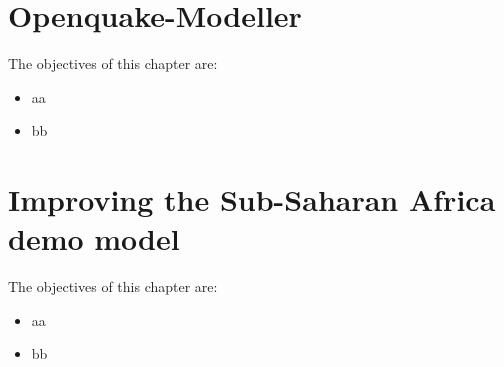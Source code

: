 \documentclass[11pt,a4paper,headings=small,dvips]{scrbook}
\newenvironment{myfancybox}{%
  \def\FrameCommand{\fboxsep=\FrameSep \fcolorbox{blue01}{honeydew}}%
  \color{black}\MakeFramed {\FrameRestore}}%
 {\endMakeFramed}
\begin{document}
\chapter{Openquake-Modeller}
\begin{myfancybox}
The objectives of this chapter are:
\begin{itemize}
    \item aa
    \item bb
\end{itemize}
\end{myfancybox}
  
\cleardoublepage
\chapter{Improving the Sub-Saharan Africa demo model}
\begin{myfancybox}
The objectives of this chapter are:
\begin{itemize}
    \item aa
    \item bb
\end{itemize}
\end{myfancybox}
    
\cleardoublepage


\cleardoublepage
\end{document}
